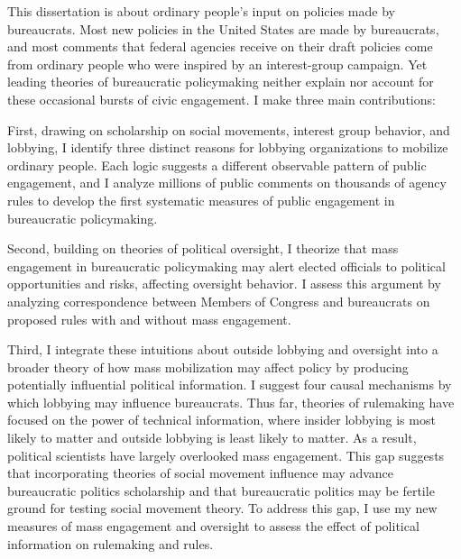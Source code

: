 This dissertation is about ordinary people's input on policies made by bureaucrats. Most new policies in the United States are made by bureaucrats, and most comments that federal agencies receive on their draft policies come from ordinary people who were inspired by an interest-group campaign. Yet leading  theories  of bureaucratic policymaking neither explain nor account for these occasional bursts of civic engagement.
I make three main contributions:

First, drawing on scholarship on social movements, interest group behavior, and lobbying, I identify three distinct reasons for lobbying organizations to mobilize ordinary people. Each logic suggests a different observable pattern of public engagement, and I analyze millions of public comments on thousands of agency rules to develop the first systematic measures of public engagement in bureaucratic policymaking. 

Second, building on theories of political oversight, I theorize that mass engagement in bureaucratic policymaking may alert elected officials to political opportunities and risks, affecting oversight behavior. I assess this argument by analyzing correspondence between Members of Congress and bureaucrats on proposed rules with and without mass engagement.

Third, I integrate these intuitions about outside lobbying and oversight into a broader theory of how mass mobilization may affect policy by producing potentially influential political information. I suggest four causal mechanisms by which lobbying may influence bureaucrats. Thus far, theories of rulemaking have focused on the power of technical information, where insider lobbying is most likely to matter and outside lobbying is least likely to matter. As a result, political scientists have largely overlooked mass engagement. This gap suggests that incorporating theories of social movement influence may advance bureaucratic politics scholarship and that bureaucratic politics may be fertile ground for testing social movement theory. To address this gap, I use my new measures of mass engagement and oversight to assess the effect of political information on rulemaking and rules.%


